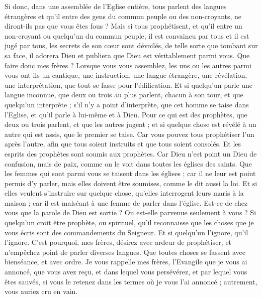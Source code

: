 \begin{multicols}{2}
Si donc, dans une assemblée de l’Eglise entière, tous parlent des langues étrangères et qu'il entre des gens du commun peuple ou des non-croyants, ne diront-ils pas que vous êtes fous ?
Mais si tous prophétisent, et qu'il entre un non-croyant ou quelqu'un du commun peuple, il est convaincu par tous et il est jugé par tous,
les secrets de son cœur sont dévoilés, de telle sorte que tombant sur sa face, il adorera Dieu et publiera que Dieu est véritablement parmi vous.
Que faire donc mes frères ? Lorsque vous vous assemblez, les uns ou les autres parmi vous ont-ils un cantique, une instruction, une langue étrangère, une révélation, une interprétation, que tout se fasse pour l'édification.
Et si quelqu'un parle une langue inconnue, que deux ou trois au plus parlent, chacun à son tour, et que quelqu’un interprète ;
s'il n'y a point d'interprète, que cet homme se taise dans l'Eglise, et qu'il parle à lui-même et à Dieu.
Pour ce qui est des prophètes, que deux ou trois parlent, et que les autres jugent ;
et si quelque chose est révélé à un autre qui est assis, que le premier se taise.
Car vous pouvez tous prophétiser l'un après l'autre, afin que tous soient instruits et que tous soient consolés.
Et les esprits des prophètes sont soumis aux prophètes.
Car Dieu n'est point un Dieu de confusion, mais de paix, comme on le voit dans toutes les églises des saints.
Que les femmes qui sont parmi vous se taisent dans les églises ; car il ne leur est point permis d’y parler, mais elles doivent être soumises, comme le dit aussi la loi.
Et si elles veulent s’instruire sur quelque chose, qu'elles interrogent leurs maris à la maison ; car il est malséant à une femme de parler dans l'église.
Est-ce de chez vous que la parole de Dieu est sortie ? Ou est-elle parvenue seulement à vous ?
Si quelqu'un croit être prophète, ou spirituel, qu'il reconnaisse que les choses que je vous écris sont des commandements du Seigneur.
Et si quelqu'un l’ignore, qu'il l’ignore.
C'est pourquoi, mes frères, désirez avec ardeur de prophétiser, et n'empêchez point de parler diverses langues.
Que toutes choses se fassent avec bienséance, et avec ordre.
\VerseOne{}Je vous rappelle mes frères, l'Evangile que je vous ai annoncé, que vous avez reçu, et dans lequel vous persévérez,
et par lequel vous êtes sauvés, si vous le retenez dans les termes où je vous l'ai annoncé ; autrement, vous auriez cru en vain.

\end{multicols}
